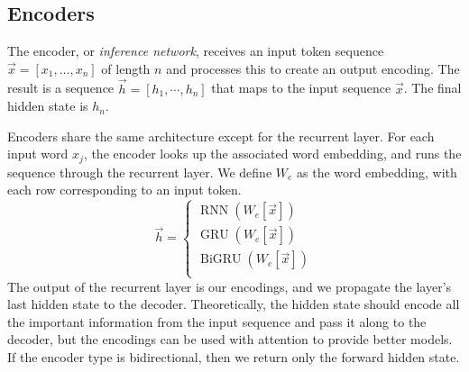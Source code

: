 \documentclass[twoside,twocolumn]{article}
\begin{document}

\subsection{Encoders}
The encoder, or \emph{inference network}, receives an input token sequence
$\vec{x} = \left[{x_1,\hdots, x_n}\right]$ of length $n$ and processes
this to create an output encoding. The result is a sequence
$\vec{h} = \left[{h_1, \cdots, h_{n}}\right]$ that
maps to the input sequence $\vec{x}$. The final hidden state is $h_n$.

Encoders share the same architecture except for the recurrent layer.
For each input word $x_j$, the encoder looks up the associated word embedding,
and runs the sequence through the recurrent layer. We define $W_e$ as the word
embedding, with each row corresponding to an input token.
\begin{equation}
  \vec{h} = \begin{cases}
    \operatorname{RNN} (W_e[\vec{x}]) \\
    \operatorname{GRU} (W_e[\vec{x}]) \\
    \operatorname{BiGRU} (W_e[\vec{x}]) \\
  \end{cases}
\end{equation}
The output of the recurrent layer is our encodings, and we propagate
the layer's last hidden state to the decoder. Theoretically, the hidden
state should encode all the important information from the input sequence
and pass it along to the decoder, but the
encodings can be used with attention to provide better models. If the encoder
type is bidirectional, then we return only the forward hidden state.
\end{document}
